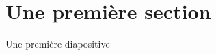 
\begin{comment}

\PassOptionsToPackage{french}{translator}

\documentclass[10pt]{beamer}

\usepackage{AOCDTF_diaporama}




\end{comment}

\section{Une première section}

\begin{frame}{Une première diapositive}
\lipsum[1]
\end{frame}

%
